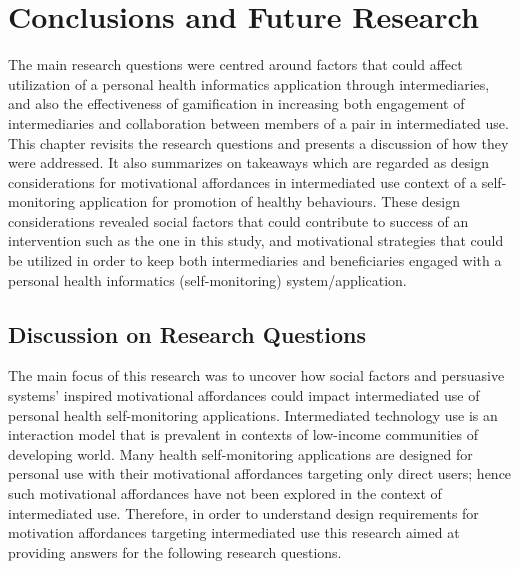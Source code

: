 
\chapter{Conclusions and Future Research} %

\label{discussionchapter} %


The main research questions were centred around factors that could affect utilization of a personal health informatics application through intermediaries, and also the effectiveness of gamification in increasing both engagement of intermediaries and collaboration between members of a pair in intermediated use. This chapter revisits the research questions and presents a discussion of how they were addressed. It also summarizes on takeaways which  are regarded as design considerations for motivational affordances in intermediated use context of a self-monitoring application for promotion of healthy behaviours. These design considerations revealed social factors that could contribute to success of an intervention such as the one in this study, and motivational strategies that could be utilized in order to keep both intermediaries and beneficiaries engaged with a personal health informatics (self-monitoring) system/application.

\section{Discussion on Research Questions}
The main focus of this research was to uncover how social factors and persuasive systems' inspired motivational affordances could impact intermediated use of personal health self-monitoring applications. Intermediated technology use is an interaction model that is prevalent in contexts of low-income communities of developing world. Many health self-monitoring applications are designed for personal use with their motivational affordances targeting only direct users; hence such motivational affordances have not been explored in the context of intermediated use. Therefore, in order to understand design requirements for motivation affordances targeting intermediated use this research aimed at providing answers for the following research questions.

